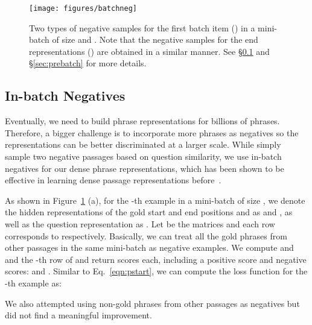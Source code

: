 \documentclass[11pt,a4paper]{article}
\begin{document}
\begin{figure}[t]
\begin{center}
\texttt{[image: figures/batchneg]}
\end{center}\vspace{-0.2cm}
\caption{Two types of negative samples for the first batch item () in a mini-batch of size  and .  Note that the negative samples for the end representations () are obtained in a similar manner. See \S\ref{sec:inbatch} and \S\ref{sec:prebatch} for more details.
}\vspace{-0.3cm}\label{fig:batchneg}
\end{figure}

 
\subsection{In-batch Negatives}\label{sec:inbatch}
Eventually, we need to build phrase representations for billions of phrases. Therefore, a bigger challenge is to incorporate more phrases as negatives so the representations can be better discriminated at a larger scale.
While \citet{seo2019real} simply sample two negative passages based on question similarity, we use in-batch negatives for our dense phrase representations, which has been shown to be effective in learning dense passage representations before~\cite{karpukhin2020dense}.

As shown in Figure~\ref{fig:batchneg} (a), for the -th example in a mini-batch of size , we denote the hidden representations of the gold start and end positions  and  as  and , as well as the question representation as . Let  be the  matrices and each row corresponds to  respectively. Basically, we can treat all the gold phrases from other passages  in the same mini-batch as negative examples.  We compute  and  and the -th row of  and  return  scores each, including a positive score and  negative scores:  and . Similar to Eq.~\eqref{eqn:pstart}, we can compute the loss function for the -th example as:\vspace{-0.5em}

We also attempted using non-gold phrases from other passages as negatives but did not find a meaningful improvement.
\end{document}
